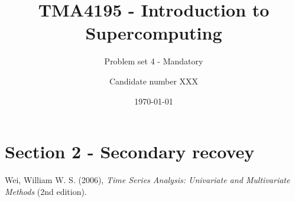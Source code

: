 \documentclass[a4paper, english, 10pt]{article}
\author{Candidate number XXX}
\title{TMA4195 - Introduction to Supercomputing}
\subtitle{Problem set 4 - Mandatory}
\date{\today}
\numberwithin{equation}{section}
\begin{document}
\maketitle %


\newpage
\section{Section 2 - Secondary recovey}






\begin{thebibliography}{9}

\label{Reference: Wei}
  Wei, William W. S. (2006),
  \textit{Time Series Analysis: Univariate and Multivariate Methods} (2nd edition).
 
\end{thebibliography}
\end{document}
